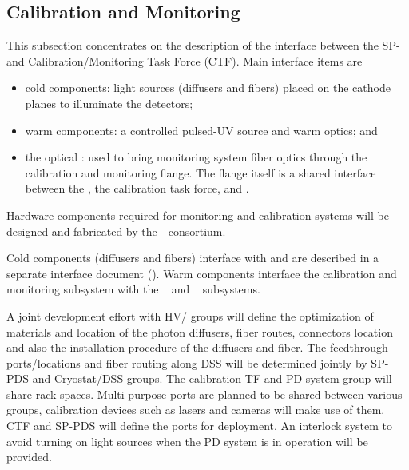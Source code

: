 \subsection{Calibration and Monitoring}
\label{sec:fdsp-pd-intfc-calib}

This subsection concentrates on the description of the interface between the SP- and Calibration/Monitoring Task Force (CTF).
Main interface items are
\begin{itemize}
    \item cold components: light sources (diffusers and fibers) placed on the cathode planes to illuminate the detectors;
    \item warm components: a controlled pulsed-UV source and warm optics; and 
    \item the optical \fdth: used to  bring monitoring system fiber optics through the calibration and monitoring flange.  The flange itself is a shared interface between the , the calibration task force, and .
\end{itemize}

Hardware components required for  monitoring and calibration systems will be designed and fabricated by the - consortium. 

Cold components (diffusers and fibers) interface with  and are described in a separate interface document (). Warm components interface the  calibration and monitoring subsystem with the ~ and ~ subsystems.

A joint development effort with HV/ groups will define the optimization of materials and location of the photon diffusers, fiber routes, connectors location and also the installation procedure of the diffusers and fiber. The feedthrough ports/locations and fiber routing along DSS will be determined jointly by SP-PDS and Cryostat/DSS groups. The calibration TF and PD system group will share rack spaces. Multi-purpose ports are planned to be shared between various groups, calibration devices such as lasers and cameras will make use of them. CTF and SP-PDS will define the ports for deployment. An interlock system to avoid turning on light sources when the PD system is in operation will be provided.

